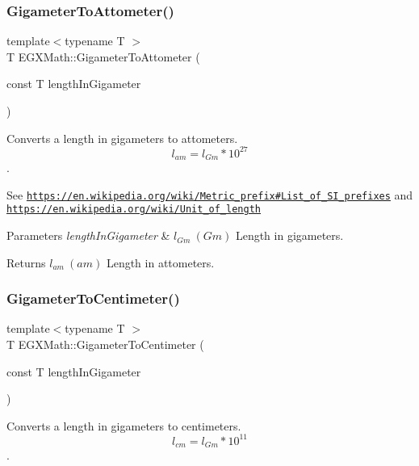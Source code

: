 \subsubsection{\texorpdfstring{Gigameter\+To\+Attometer()}{GigameterToAttometer()}}
{\footnotesize\ttfamily template$<$typename T $>$ \\
T E\+G\+X\+Math\+::\+Gigameter\+To\+Attometer (\begin{DoxyParamCaption}\item[{const T}]{length\+In\+Gigameter }\end{DoxyParamCaption})}



Converts a length in gigameters to attometers. \[ l_{am}=l_{Gm} * 10^{27} \]. 

See \href{https://en.wikipedia.org/wiki/Metric_prefix#List_of_SI_prefixes}{\tt https\+://en.\+wikipedia.\+org/wiki/\+Metric\+\_\+prefix\#\+List\+\_\+of\+\_\+\+S\+I\+\_\+prefixes} and \href{https://en.wikipedia.org/wiki/Unit_of_length}{\tt https\+://en.\+wikipedia.\+org/wiki/\+Unit\+\_\+of\+\_\+length} 
\begin{DoxyParams}{Parameters}
{\em length\+In\+Gigameter} & $ l_{Gm}\ (Gm)$ Length in gigameters. \\
\hline
\end{DoxyParams}
\begin{DoxyReturn}{Returns}
$ l_{am}\ (am)$ Length in attometers. 
\end{DoxyReturn}
\mbox{\label{group___e_g_x_math-_conversions-_length_conversions-_s_i-_gigameter-_s_i_gac0fc033ff4b887e157a333cde344b824}} 
\subsubsection{\texorpdfstring{Gigameter\+To\+Centimeter()}{GigameterToCentimeter()}}
{\footnotesize\ttfamily template$<$typename T $>$ \\
T E\+G\+X\+Math\+::\+Gigameter\+To\+Centimeter (\begin{DoxyParamCaption}\item[{const T}]{length\+In\+Gigameter }\end{DoxyParamCaption})}



Converts a length in gigameters to centimeters. \[ l_{cm}=l_{Gm} * 10^{11} \]. 

